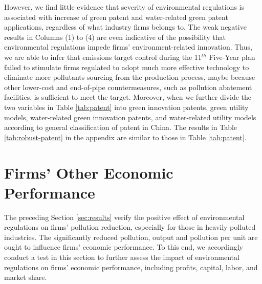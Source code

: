\documentclass[12pt,english]{article}
\begin{document}
However, we find little evidence that severity of environmental regulations is associated with increase of green patent and water-related green patent applications, regardless of what industry firms belongs to. The weak negative results in Columns (1) to (4) are even indicative of the possibility that environmental regulations impede firms’ environment-related innovation. Thus, we are able to infer that emissions target control during the 11$^{th}$ Five-Year plan failed to stimulate firms regulated to adopt much more effective technology to eliminate more pollutants sourcing from the production process, maybe because other lower-cost and end-of-pipe countermeasures, such as pollution abatement facilities, is sufficient to meet the target. Moreover, when we further divide the two variables in Table \ref{tab:patent} into green innovation patents, green utility models, water-related green innovation patents, and water-related utility models according to general classification of patent in China. The results in Table \ref{tab:robust-patent} in the appendix are similar to those in Table \ref{tab:patent}.



\section{Firms' Other Economic Performance}\label{sec:performance}

The preceding Section \ref{sec:results} verify the positive effect of environmental regulations on firms' pollution reduction, especially for those in heavily polluted industries. The significantly reduced pollution, output and pollution per unit are ought to influence firms' economic performance. To this end, we accordingly conduct a test in this section to further assess the impact of environmental regulations on firms' economic performance, including profits, capital, labor, and market share.
\end{document}
